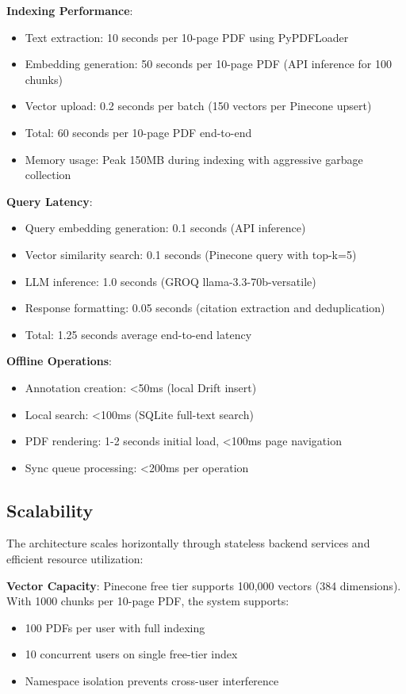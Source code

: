 \documentclass[conference]{IEEEtran}
\begin{document}
\textbf{Indexing Performance}:
\begin{itemize}
\item Text extraction: 10 seconds per 10-page PDF using PyPDFLoader
\item Embedding generation: 50 seconds per 10-page PDF (API inference for 100 chunks)
\item Vector upload: 0.2 seconds per batch (150 vectors per Pinecone upsert)
\item Total: 60 seconds per 10-page PDF end-to-end
\item Memory usage: Peak 150MB during indexing with aggressive garbage collection
\end{itemize}

\textbf{Query Latency}:
\begin{itemize}
\item Query embedding generation: 0.1 seconds (API inference)
\item Vector similarity search: 0.1 seconds (Pinecone query with top-k=5)
\item LLM inference: 1.0 seconds (GROQ llama-3.3-70b-versatile)
\item Response formatting: 0.05 seconds (citation extraction and deduplication)
\item Total: 1.25 seconds average end-to-end latency
\end{itemize}

\textbf{Offline Operations}:
\begin{itemize}
\item Annotation creation: <50ms (local Drift insert)
\item Local search: <100ms (SQLite full-text search)
\item PDF rendering: 1-2 seconds initial load, <100ms page navigation
\item Sync queue processing: <200ms per operation
\end{itemize}


\subsection{Scalability}

The architecture scales horizontally through stateless backend services and efficient resource utilization:

\textbf{Vector Capacity}: Pinecone free tier supports 100,000 vectors (384 dimensions). With 1000 chunks per 10-page PDF, the system supports:
\begin{itemize}
\item 100 PDFs per user with full indexing
\item 10 concurrent users on single free-tier index
\item Namespace isolation prevents cross-user interference
\end{itemize}
\end{document}
